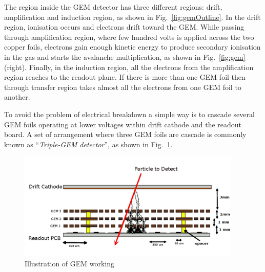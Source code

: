 The region inside the GEM detector has three different regions: drift, amplification and induction region, as shown in Fig.~\ref{fig:gemOutline}.
In the drift region, ionisation occurs and electrons drift toward the GEM. 
While passing through amplification region, where few hundred volts is applied across the two copper foils, electrons gain enough kinetic energy to produce secondary ionisation in the gas and starts the avalanche multiplication, as shown in Fig.~\ref{fig:gem}(right).
Finally, in the induction region, all the electrons from the amplification region reaches to the readout plane. 
If there is more than one GEM foil then through transfer region takes almost all the electrons from one GEM foil to another.

To avoid the problem of electrical breakdown a simple way is to cascade several GEM foils operating at lower voltages within drift cathode and the readout board.
A set of arrangement where three GEM foils are cascade is commonly known as ``\textit{Triple-GEM detector}'', as shown in Fig.~\ref{fig:gemgaps}.
\begin{figure}[!htbp]
    \begin{center}
        \includegraphics[width=0.95\textwidth]{figures/GEM/triple_gem.png}
        \caption{Illustration of GEM working}
        \label{fig:gemgaps}
    \end{center}
\end{figure} 

